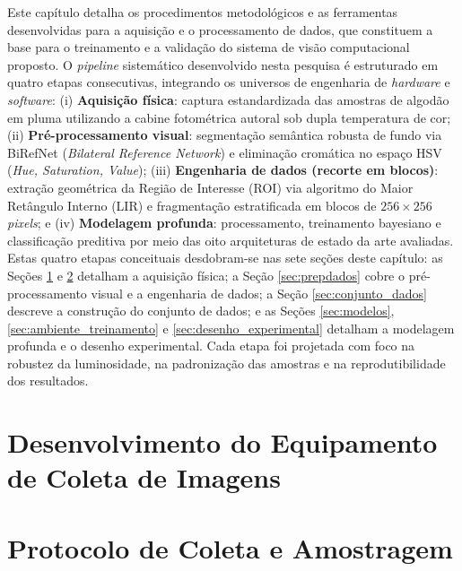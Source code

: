 
Este capítulo detalha os procedimentos metodológicos e as ferramentas desenvolvidas para a aquisição e o processamento de dados, que constituem a base para o treinamento e a validação do sistema de visão computacional proposto. O \textit{pipeline} sistemático desenvolvido nesta pesquisa é estruturado em quatro etapas consecutivas, integrando os universos de engenharia de \textit{hardware} e \textit{software}: (i) \textbf{Aquisição física}: captura estandardizada das amostras de algodão em pluma utilizando a cabine fotométrica autoral sob dupla temperatura de cor; (ii) \textbf{Pré-processamento visual}: segmentação semântica robusta de fundo via BiRefNet (\textit{Bilateral Reference Network}) e eliminação cromática no espaço HSV (\textit{Hue, Saturation, Value}); (iii) \textbf{Engenharia de dados (recorte em blocos)}: extração geométrica da Região de Interesse (ROI) via algoritmo do Maior Retângulo Interno (LIR) e fragmentação estratificada em blocos de $256 \times 256$ \textit{pixels}; e (iv) \textbf{Modelagem profunda}: processamento, treinamento bayesiano e classificação preditiva por meio das oito arquiteturas de estado da arte avaliadas. Estas quatro etapas conceituais desdobram-se nas sete seções deste capítulo: as Seções \ref{sec:sistema_aquisicao} e \ref{sec:protocolo_coleta} detalham a aquisição física; a Seção \ref{sec:prepdados} cobre o pré-processamento visual e a engenharia de dados; a Seção \ref{sec:conjunto_dados} descreve a construção do conjunto de dados; e as Seções \ref{sec:modelos}, \ref{sec:ambiente_treinamento} e \ref{sec:desenho_experimental} detalham a modelagem profunda e o desenho experimental. Cada etapa foi projetada com foco na robustez da luminosidade, na padronização das amostras e na reprodutibilidade dos resultados.


\section{Desenvolvimento do Equipamento de Coleta de Imagens}
\label{sec:sistema_aquisicao}

    

\section{Protocolo de Coleta e Amostragem}
\label{sec:protocolo_coleta}

    

